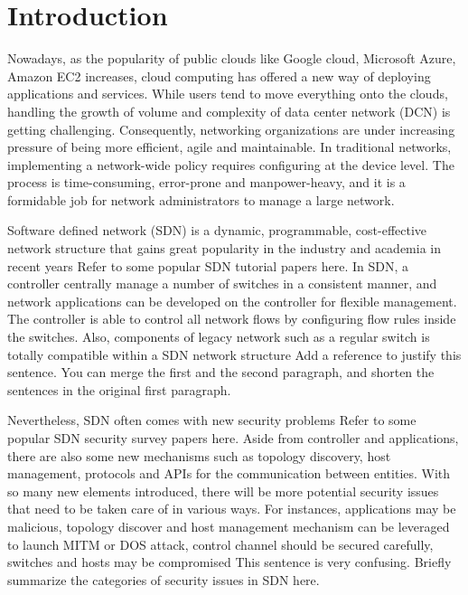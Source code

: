 \chapter{Introduction}
\label{chap:intro}
\setcounter{page}{1}

Nowadays, as the popularity of public clouds like Google cloud, Microsoft Azure, Amazon EC2 increases, cloud computing has offered a new way of deploying applications and services. While users tend to move everything onto the clouds, handling the growth of volume and complexity of data center network (DCN) is getting challenging. Consequently, networking organizations are under increasing pressure of being more efficient, agile and maintainable. In traditional networks, implementing a network-wide policy requires configuring at the device level. The process is time-consuming, error-prone and manpower-heavy, and it is a formidable job for network administrators to manage a large network.

Software defined network (SDN) is a dynamic, programmable, cost-effective network structure that gains great popularity in the industry and academia in recent years \cite{KRVRAU15, MABPPRST08, LHM10}{\color{red} Refer to some popular SDN tutorial papers here}. In SDN, a controller centrally manage a number of switches in a consistent manner, and network applications can be developed on the controller for flexible management. The controller is able to control all network flows by configuring flow rules inside the switches. Also, components of legacy network such as a regular switch is totally compatible within a SDN network structure {\color{red} Add a reference to justify this sentence}. {\color{red} You can merge the first and the second paragraph, and shorten the sentences in the original first paragraph.}

Nevertheless, SDN often comes with new security problems \cite{SOS13, CM}{\color{red} Refer to some popular SDN security survey papers here}. Aside from controller and applications, there are also some new mechanisms such as topology discovery, host management, protocols and APIs for the communication between entities. With so many new elements introduced, there will be more potential security issues that need to be taken care of in various ways. For instances, applications may be malicious, topology discover and host management mechanism can be leveraged to launch MITM or DOS attack, control channel should be secured carefully, switches and hosts may be compromised {\color{red} This sentence is very confusing}. {\color{red} Briefly summarize the categories of security issues in SDN here.}

